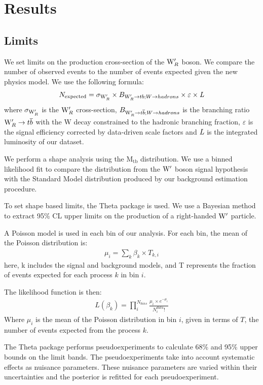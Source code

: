 \clearpage
\newpage
\chapter{Results}
\section{Limits}
\label{sec:stats}
We set limits on the production cross-section of 
the $\mathrm{W}^\prime_R$ boson. We compare the number 
of observed events to the number of events expected given the new physics model. We use the following formula:
\begin{eqnarray}
N_{\textrm{expected}} = \sigma_{\mathrm{W}^\prime_R} \times B_{\mathrm{W}^\prime_R \rightarrow tb;W \to hadrons} \times \varepsilon \times \emph{L}
\end{eqnarray}
where $\sigma_{\mathrm{W}^\prime_R}$ is the $\mathrm{W}^\prime_R$ cross-section, $B_{\mathrm{W}^\prime_R \rightarrow {t\overline{b}};W \to hadrons}$ is the branching ratio 
$\mathrm{W}^\prime_R \to {t\overline{b}}$ with the W decay constrained to the hadronic branching fraction, $\varepsilon$ is the signal efficiency corrected by data-driven scale factors and $\emph{L}$ is the integrated luminosity of our dataset. 

We perform a shape analysis using the $\mathrm{M_{tb}}$ distribution.  We use a binned likelihood fit to compare the distribution from the $\mathrm{W}^\prime$ boson signal 
hypothesis with the Standard Model distribution produced by our background estimation procedure.  

\label{sec:Theta}
To set shape based limits, the Theta package \cite{theta} is used.  We use a Bayesian method to extract 95\% CL upper limits 
on the production of a right-handed $\mathrm{W}^\prime$ particle.  

A Poisson model is used in each bin of our analysis.  For each bin, the mean of the Poisson distribution is:
\begin{eqnarray}
\mu_i = \sum_k \beta_k \times T_{k,i}
\end{eqnarray}
here, k includes the signal and background models, and T represents the fraction of events expected for each process $k$ in bin $i$.

The likelihood function is then:
\begin{eqnarray}
L(\beta_k) = \prod^{N_{bins}}_i \frac{\mu_i \times e^{-\mu_i}}{N^{data}_i!}
\end{eqnarray}
Where $\mu_i$ is the mean of the Poisson distribution in bin $i$, given in terms of $T$, the number of events expected from the process $k$.

The Theta package performs pseudoexperiments to calculate 68\% and 95\% upper bounds on the limit bands.  
The pseudoexperiments take into account systematic effects as nuisance parameters.  These nuisance parameters 
are varied within their uncertainties and the posterior is refitted for each pseudoexperiment.  

